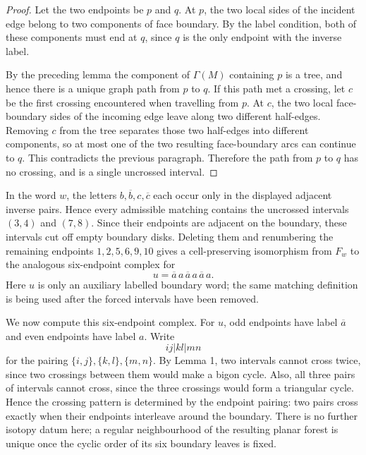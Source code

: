 \documentclass[12pt]{article}
\newcommand{\ol}{\overline}
\begin{document}
\begin{proof}
Let the two endpoints be \(p\) and \(q\).  At \(p\), the two local sides
of the incident edge belong to two components of face boundary.  By the
label condition, both of these components must end at \(q\), since
\(q\) is the only endpoint with the inverse label.

By the preceding lemma the component of \(\Gamma(M)\) containing \(p\)
is a tree, and hence there is a unique graph path from \(p\) to \(q\).
If this path met a crossing, let \(c\) be the first crossing encountered
when travelling from \(p\).  At \(c\), the two local face-boundary sides
of the incoming edge leave along two different half-edges.  Removing
\(c\) from the tree separates those two half-edges into different
components, so at most one of the two resulting face-boundary arcs can
continue to \(q\).  This contradicts the previous paragraph.  Therefore
the path from \(p\) to \(q\) has no crossing, and is a single uncrossed
interval.
\end{proof}

In the word \(w\), the letters \(b,\ol b,c,\ol c\) each occur only in
the displayed adjacent inverse pairs.  Hence every admissible matching
contains the uncrossed intervals \((3,4)\) and \((7,8)\).  Since their
endpoints are adjacent on the boundary, these intervals cut off empty
boundary disks.  Deleting them and renumbering the remaining endpoints
\(1,2,5,6,9,10\) gives a cell-preserving isomorphism from \(F_w\) to the
analogous six-endpoint complex for
\[
        u=\ol a\,a\,\ol a\,a\,\ol a\,a .
\]
Here \(u\) is only an auxiliary labelled boundary word; the same matching
definition is being used after the forced intervals have been removed.

We now compute this six-endpoint complex.  For \(u\), odd endpoints have
label \(\ol a\) and even endpoints have label \(a\).  Write
\[
        ij|kl|mn
\]
for the pairing \(\{i,j\},\{k,l\},\{m,n\}\).  By Lemma 1, two intervals
cannot cross twice, since two crossings between them would make a bigon
cycle.  Also, all three pairs of intervals cannot cross, since the
three crossings would form a triangular cycle.  Hence the crossing
pattern is determined by the endpoint pairing: two pairs cross exactly
when their endpoints interleave around the boundary.  There is no
further isotopy datum here; a regular neighbourhood of the resulting
planar forest is unique once the cyclic order of its six boundary leaves
is fixed.
\end{document}
